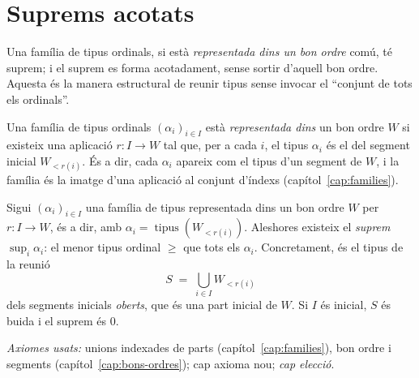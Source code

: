 \section{Suprems acotats}\label{sec:suprems}

Una família de tipus ordinals, si està \emph{representada dins un bon ordre}
comú, té suprem; i el suprem es forma acotadament, sense sortir d'aquell bon
ordre. Aquesta és la manera estructural de reunir tipus sense invocar el
\enquote{conjunt de tots els ordinals}.

\begin{definicio}\label{def:familia-tipus}
Una família de tipus ordinals \((\alpha_i)_{i\in I}\) està \emph{representada
dins} un bon ordre \(W\) si existeix una aplicació \(r\colon I\to W\) tal que,
per a cada \(i\), el tipus \(\alpha_i\) és el del segment inicial
\(W_{<r(i)}\). És a dir, cada \(\alpha_i\) apareix com el tipus d'un segment de
\(W\), i la família és la imatge d'una aplicació al conjunt d'índexs
(capítol~\ref{cap:families}).
\end{definicio}

\begin{proposicio}\label{prop:suprem}
Sigui \((\alpha_i)_{i\in I}\) una família de tipus representada dins un bon
ordre \(W\) per \(r\colon I\to W\), és a dir, amb
\(\alpha_i=\operatorname{tipus}(W_{<r(i)})\). Aleshores existeix el
\emph{suprem} \(\sup_i\alpha_i\): el menor tipus ordinal \(\ge\) que tots els
\(\alpha_i\). Concretament, és el tipus de la reunió
\[
S\;=\;\bigcup_{i\in I}W_{<r(i)}
\]
dels segments inicials \emph{oberts}, que és una part inicial de \(W\). Si
\(I\) és inicial, \(S\) és buida i el suprem és \(0\).\par
\emph{Axiomes usats:} unions indexades de parts (capítol~\ref{cap:families}),
bon ordre i segments (capítol~\ref{cap:bons-ordres}); cap axioma nou; \emph{cap
elecció}.
\end{proposicio}

